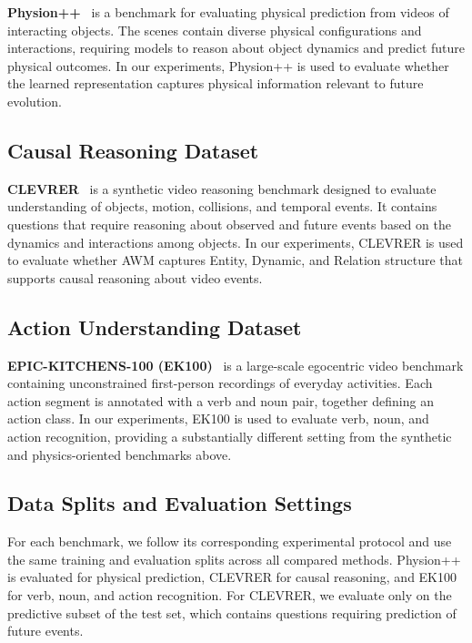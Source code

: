 \documentclass{article}
\begin{document}
\textbf{Physion++}~\citep{bear2021physion} is a benchmark for evaluating physical prediction from videos of interacting objects. The scenes contain diverse physical configurations and interactions, requiring models to reason about object dynamics and predict future physical outcomes. In our experiments, Physion++ is used to evaluate whether the learned representation captures physical information relevant to future evolution.

\subsection{Causal Reasoning Dataset}

\textbf{CLEVRER}~\citep{yi2020clevrer} is a synthetic video reasoning benchmark designed to evaluate understanding of objects, motion, collisions, and temporal events. It contains questions that require reasoning about observed and future events based on the dynamics and interactions among objects. In our experiments, CLEVRER is used to evaluate whether AWM captures Entity, Dynamic, and Relation structure that supports causal reasoning about video events.

\subsection{Action Understanding Dataset}

\textbf{EPIC-KITCHENS-100 (EK100)}~\citep{damend2022epic} is a large-scale egocentric video benchmark containing unconstrained first-person recordings of everyday activities. Each action segment is annotated with a verb and noun pair, together defining an action class. In our experiments, EK100 is used to evaluate verb, noun, and action recognition, providing a substantially different setting from the synthetic and physics-oriented benchmarks above.

\subsection{Data Splits and Evaluation Settings}

For each benchmark, we follow its corresponding experimental protocol and use the same training and evaluation splits across all compared methods. Physion++ is evaluated for physical prediction, CLEVRER for causal reasoning, and EK100 for verb, noun, and action recognition. For CLEVRER, we evaluate only on the predictive subset of the test set, which contains questions requiring prediction of future events.
\end{document}
